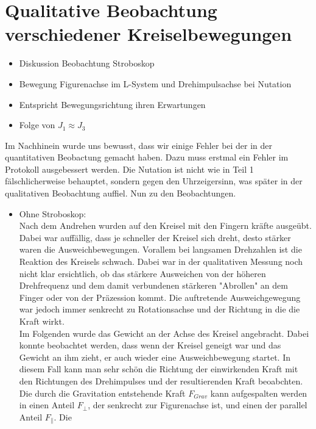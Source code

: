 

\section{Qualitative Beobachtung verschiedener Kreiselbewegungen}

\begin{itemize}
    \item Diskussion Beobachtung Stroboskop
    \item Bewegung Figurenachse im L-System und Drehimpulsachse bei Nutation
    \item Entspricht Bewegungsrichtung ihren Erwartungen
    \item Folge von $J_1 \approx J_3$
\end{itemize}

Im Nachhinein wurde uns bewusst, dass wir einige Fehler bei der in der quantitativen Beobactung gemacht haben. 
Dazu muss erstmal ein Fehler im Protokoll ausgebessert werden. Die Nutation ist nicht wie in Teil 1 fälschlicherweise 
behauptet, sondern gegen den Uhrzeigersinn, was später in der qualitativen Beobachtung auffiel. Nun zu den Beobachtungen.
\begin{itemize}
    \item Ohne Stroboskop:\\
    Nach dem Andrehen wurden auf den Kreisel mit den Fingern kräfte ausgeübt. Dabei war auffällig, dass je schneller der Kreisel sich dreht, desto stärker waren die Ausweichbewegungen.
    Vorallem bei langsamen Drehzahlen ist die Reaktion des Kreisels schwach. Dabei war in der qualitativen Messung noch nicht klar ersichtlich, ob das stärkere Ausweichen 
    von der höheren Drehfrequenz und dem damit verbundenen stärkeren "Abrollen" an dem Finger oder von der Präzession kommt. Die auftretende Ausweichgewegung war jedoch immer 
    senkrecht zu Rotationsachse und der Richtung in die die Kraft wirkt. \\
    Im Folgenden wurde das Gewicht an der Achse des Kreisel angebracht. Dabei konnte beobachtet werden, dass wenn der Kreisel geneigt war und das Gewicht an ihm zieht, er auch wieder 
    eine Ausweichbewegung startet. In diesem Fall kann man sehr schön die Richtung der einwirkenden Kraft mit den Richtungen des Drehimpulses und der resultierenden Kraft beoabchten.
    Die durch die Gravitation entstehende Kraft $F_{Grav}$ kann aufgespalten werden in einen Anteil $F_{\bot}$, der senkrecht zur Figurenachse ist, und einen der parallel Anteil $F_{\| }$. Die 
\end{itemize}
